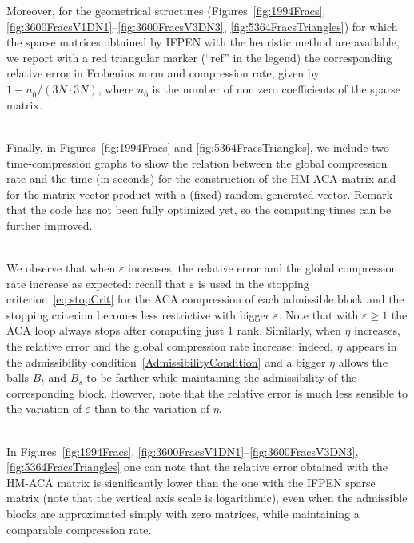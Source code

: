 Moreover, for the geometrical structures (Figures~\ref{fig:1994Fracs}, \ref{fig:3600FracsV1DN1}--\ref{fig:3600FracsV3DN3}, \ref{fig:5364FracsTriangles}) for which the sparse matrices obtained by IFPEN with the heuristic method are available, we report with a red triangular marker (``ref'' in the legend) the corresponding relative error in Frobenius norm and compression rate, given by $1- n_{\bar{0}}/(3N\cdot3N)$, where $n_{\bar{0}}$ is the number of non zero coefficients of the sparse matrix.

\quad\\
Finally, in Figures~\ref{fig:1994Fracs} and \ref{fig:5364FracsTriangles}, we include two time-compression graphs to show the relation between the global compression rate and the time (in seconds) for the construction of the HM-ACA matrix and for the matrix-vector product with a (fixed) random generated vector. Remark that the code has not been fully optimized yet, so the computing times can be further improved.  

\quad\\
We observe that when $\varepsilon$ increases, the relative error and the global compression rate increase as expected: recall that $\varepsilon$ is used in the stopping criterion~\eqref{eq:stopCrit} for the ACA compression of each admissible block and the stopping criterion becomes less restrictive with bigger $\varepsilon$. Note that with $\varepsilon \ge 1$ the ACA loop always stops after computing just $1$ rank. 
Similarly, when $\eta$ increases, the relative error and the global compression rate increase: indeed, $\eta$ appears in the admissibility condition~\eqref{AdmissibilityCondition} and a bigger $\eta$ allows the balls $B_t$ and $B_s$ to be farther while maintaining the admissibility of the corresponding block.
However, note that the relative error is much less sensible to the variation of $\varepsilon$ than to the variation of $\eta$.

\quad\\
In Figures~\ref{fig:1994Fracs}, \ref{fig:3600FracsV1DN1}--\ref{fig:3600FracsV3DN3}, \ref{fig:5364FracsTriangles} one can note that the relative error obtained with the HM-ACA matrix is significantly lower than the one with the IFPEN sparse matrix (note that the vertical axis scale is logarithmic), even when the admissible blocks are approximated simply with zero matrices, while maintaining a comparable compression rate. 

